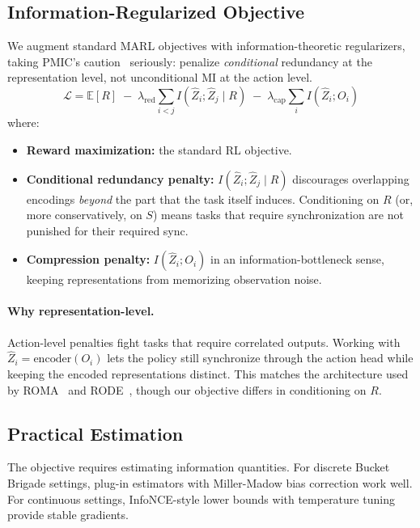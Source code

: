 \documentclass[10pt, letterpaper]{article}
\begin{document}
\subsection{Information-Regularized Objective}

We augment standard MARL objectives with information-theoretic regularizers, taking PMIC's caution~\cite{li2022pmic} seriously: penalize \emph{conditional} redundancy at the representation level, not unconditional MI at the action level.
\[\mathcal{L} = \mathbb{E}[R] \;-\; \lambda_{\text{red}} \sum_{i < j} I\!\left(\hat{Z}_i; \hat{Z}_j \mid R\right) \;-\; \lambda_{\text{cap}} \sum_i I\!\left(\hat{Z}_i; O_i\right)\]
where:
\begin{itemize}
    \item \textbf{Reward maximization:} the standard RL objective.
    \item \textbf{Conditional redundancy penalty:} $I(\hat{Z}_i; \hat{Z}_j \mid R)$ discourages overlapping encodings \emph{beyond} the part that the task itself induces. Conditioning on $R$ (or, more conservatively, on $S$) means tasks that require synchronization are not punished for their required sync.
    \item \textbf{Compression penalty:} $I(\hat{Z}_i; O_i)$ in an information-bottleneck sense, keeping representations from memorizing observation noise.
\end{itemize}

\paragraph{Why representation-level.} Action-level penalties fight tasks that require correlated outputs. Working with $\hat{Z}_i = \mathrm{encoder}(O_i)$ lets the policy still synchronize through the action head while keeping the encoded representations distinct. This matches the architecture used by ROMA~\cite{wang2020roma} and RODE~\cite{wang2021rode}, though our objective differs in conditioning on $R$.

\subsection{Practical Estimation}

The objective requires estimating information quantities. For discrete Bucket Brigade settings, plug-in estimators with Miller-Madow bias correction work well. For continuous settings, InfoNCE-style lower bounds with temperature tuning provide stable gradients.
\end{document}
